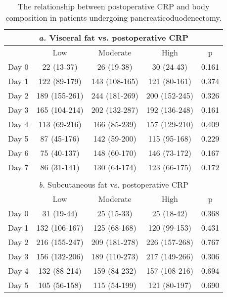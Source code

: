 \begin{table}[p]
	\caption{The relationship  between postoperative CRP and body composition in patients undergoing pancreaticoduodenectomy. }
	\label{table:sirs_bodycomp_crp}
	\centering
	\renewcommand{\arraystretch}{1.2} %
	\setlength{\tabcolsep}{9pt} %
	
	\begin{tabular}{|l c c c c |}
		  \multicolumn{5}{c}{\textit{a.} Visceral fat vs. postoperative CRP}   \\ \hline
		      & Low           & Moderate      & High          & p              \\
		Day 0 & 22 (13-37)    & 26 (19-38)    & 30 (24-43)    & 0.161          \\
		Day 1 & 122 (89-179)  & 143 (108-165) & 121 (80-161)  & 0.374          \\
		Day 2 & 189 (155-261) & 244 (181-269) & 200 (152-245) & 0.326          \\
		Day 3 & 165 (104-214) & 202 (132-287) & 192 (136-248) & 0.161          \\
		Day 4 & 113 (69-216)  & 166 (85-239)  & 157 (129-210) & 0.409          \\
		Day 5 & 87 (45-176)   & 142 (59-200)  & 115 (95-168)  & 0.229          \\
		Day 6 & 75 (40-137)   & 148 (60-170)  & 146 (73-172)  & 0.167          \\
		Day 7 & 86 (31-141)   & 130 (64-174)  & 123 (66-175)  & 0.172          \\ \hline
		                         \multicolumn{5}{c}{}                          \\
		\multicolumn{5}{c}{\textit{b.} Subcutaneous fat vs. postoperative CRP} \\ \hline
		      & Low           & Moderate      & High          & p              \\
		Day 0 & 31 (19-44)    & 25 (15-33)    & 25 (18-42)    & 0.368          \\
		Day 1 & 132 (106-167) & 125 (68-168)  & 120 (99-153)  & 0.431          \\
		Day 2 & 216 (155-247) & 209 (181-278) & 226 (157-268) & 0.767          \\
		Day 3 & 156 (132-206) & 189 (110-273) & 217 (149-266) & 0.306          \\
		Day 4 & 132 (88-214)  & 159 (84-232)  & 157 (108-216) & 0.694          \\
		Day 5 & 105 (56-158)  & 115 (54-199)  & 121 (80-197)  & 0.690          \\

\end{tabular}
\end{table}
